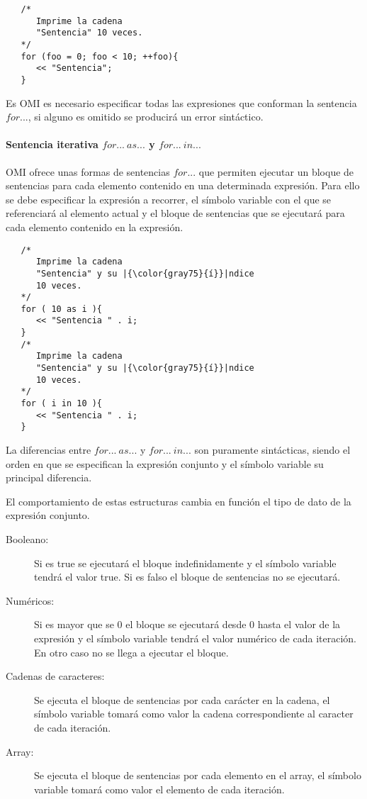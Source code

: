 \begin{lstlisting}
   /*
      Imprime la cadena 
      "Sentencia" 10 veces.
   */
   for (foo = 0; foo < 10; ++foo){
      << "Sentencia"; 
   }
\end{lstlisting}

Es OMI es necesario especificar todas las expresiones que conforman la sentencia $for...$, si alguno es omitido se
producirá un error sintáctico.


\paragraph{Sentencia iterativa $for...\ as...$ y $for...\ in...$} \label{sec:stmt_foreach}

OMI ofrece unas formas de sentencias $for...$ que permiten ejecutar un bloque de sentencias para cada elemento contenido 
en una determinada expresión. Para ello se debe especificar la expresión a recorrer, el símbolo variable con el 
que se referenciará al elemento actual y el bloque de sentencias que se ejecutará para cada elemento contenido 
en la expresión. \\


\begin{lstlisting}
   /*
      Imprime la cadena 
      "Sentencia" y su |{\color{gray75}{í}}|ndice 
      10 veces.
   */
   for ( 10 as i ){
      << "Sentencia " . i; 
   }
   /*
      Imprime la cadena 
      "Sentencia" y su |{\color{gray75}{í}}|ndice
      10 veces.
   */
   for ( i in 10 ){
      << "Sentencia " . i; 
   }
\end{lstlisting}


La diferencias entre $for...\ as...$ y $for...\ in...$ son puramente sintácticas, siendo el orden en que se especifican la expresión conjunto y el
símbolo variable su principal diferencia.

El comportamiento de estas estructuras cambia en función el tipo de dato de la expresión conjunto. 

\begin{description}
\item [Booleano:] Si es true se ejecutará el bloque indefinidamente y el símbolo variable tendrá el valor true. Si es falso el bloque de sentencias no se ejecutará.
\item [Numéricos:] Si es mayor que se $0$ el bloque se ejecutará desde 0 hasta el valor de la expresión y el símbolo variable tendrá el valor numérico de cada iteración.
En otro caso no se llega a ejecutar el bloque.
\item [Cadenas de caracteres:] Se ejecuta el bloque de sentencias por cada carácter en la cadena, el símbolo variable tomará como valor la cadena correspondiente al 
caracter de cada iteración.
\item [Array:] Se ejecuta el bloque de sentencias por cada elemento en el array, el símbolo variable tomará como valor el elemento de cada iteración.
\end{description} 

